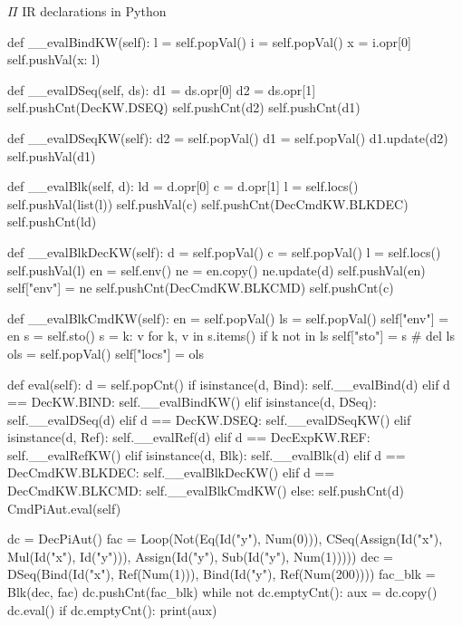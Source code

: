 \documentclass{beamer}
\begin{document}
\begin{frame}{{\color{red}$\Pi$ IR} declarations in Python}
\begin{python}
   def __evalBindKW(self):
       l = self.popVal()
       i = self.popVal()
       x = i.opr[0]
       self.pushVal({x: l})

   def __evalDSeq(self, ds):
       d1 = ds.opr[0]
       d2 = ds.opr[1]
       self.pushCnt(DecKW.DSEQ)
       self.pushCnt(d2)
       self.pushCnt(d1)

   def __evalDSeqKW(self):
       d2 = self.popVal()
       d1 = self.popVal()
       d1.update(d2)
       self.pushVal(d1)

   def __evalBlk(self, d):
       ld = d.opr[0]
       c = d.opr[1]
       l = self.locs()
       self.pushVal(list(l))
       self.pushVal(c)
       self.pushCnt(DecCmdKW.BLKDEC)
       self.pushCnt(ld)

   def __evalBlkDecKW(self):
       d = self.popVal()
       c = self.popVal()
       l = self.locs()
       self.pushVal(l)
       en = self.env()
       ne = en.copy()
       ne.update(d)
       self.pushVal(en)
       self["env"] = ne
       self.pushCnt(DecCmdKW.BLKCMD)
       self.pushCnt(c)

   def __evalBlkCmdKW(self):
       en = self.popVal()
       ls = self.popVal()
       self["env"] = en
       s = self.sto()
       s = {k: v for k, v in s.items() if k not in ls}
       self["sto"] = s
       # del ls
       ols = self.popVal()
       self["locs"] = ols

   def eval(self):
       d = self.popCnt()
       if isinstance(d, Bind):
           self.__evalBind(d)
       elif d == DecKW.BIND:
           self.__evalBindKW()
       elif isinstance(d, DSeq):
           self.__evalDSeq(d)
       elif d == DecKW.DSEQ:
           self.__evalDSeqKW()
       elif isinstance(d, Ref):
           self.__evalRef(d)
       elif d == DecExpKW.REF:
           self.__evalRefKW()
       elif isinstance(d, Blk):
           self.__evalBlk(d)
       elif d == DecCmdKW.BLKDEC:
           self.__evalBlkDecKW()
       elif d == DecCmdKW.BLKCMD:
           self.__evalBlkCmdKW()
       else:
           self.pushCnt(d)
           CmdPiAut.eval(self)
\end{python}

\framebreak

\begin{python}
dc = DecPiAut()
fac = Loop(Not(Eq(Id("y"), Num(0))),
          CSeq(Assign(Id("x"), Mul(Id("x"), Id("y"))),
               Assign(Id("y"), Sub(Id("y"), Num(1)))))
dec = DSeq(Bind(Id("x"), Ref(Num(1))),
          Bind(Id("y"), Ref(Num(200))))
fac_blk = Blk(dec, fac)
dc.pushCnt(fac_blk)
while not dc.emptyCnt():
   aux = dc.copy()
   dc.eval()
   if dc.emptyCnt():
       print(aux)
\end{python}

\end{frame}
\end{document}
